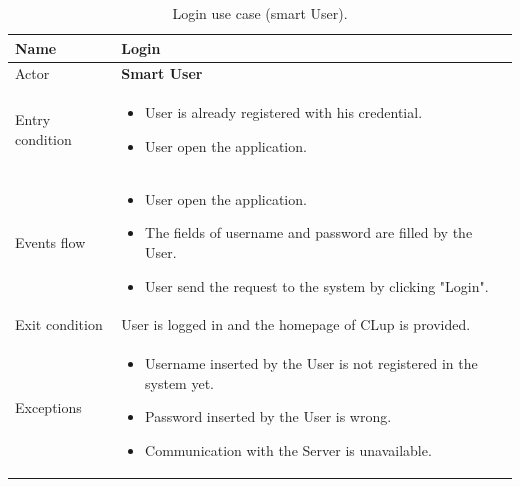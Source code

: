 \begin{table}[H]\begin{tabular}{|p{5cm} | p{7cm} | }
\hline
Name & \textbf{Login} \\
\hline
Actor & \textbf{Smart User} \\
\hline
Entry condition &
\begin{itemize}
\item User is already registered with his credential. 
\item User open the application.
\end{itemize} \\
\hline
Events flow & 
\begin{itemize}
	\item User open the application.
	\item The fields of username and password are filled by the User. 
	\item User send the request to the system by clicking "Login".
\end{itemize} \\
\hline
Exit condition & User is logged in and the homepage of CLup is provided. \\
\hline 
Exceptions &
\begin{itemize}
	\item Username inserted by the User is not registered in the system yet.
	\item Password inserted by the User is wrong.
    \item Communication with the Server is unavailable.
\end{itemize} \\
\hline
\end{tabular}

\caption{Login use case (smart User).}

\end{table}

